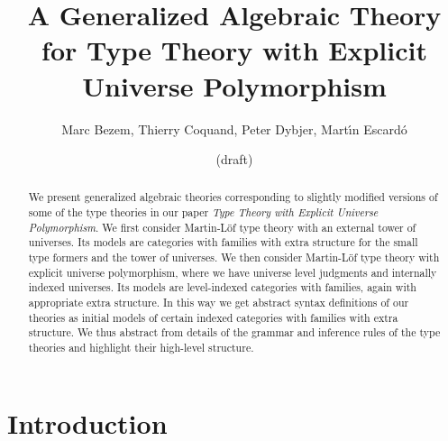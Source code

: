 \documentclass[11pt,a4paper]{article}
\theoremstyle{plain}
\theoremstyle{definition}
\begin{document}
\title{A Generalized Algebraic Theory\\ for Type Theory
with Explicit Universe Polymorphism
}

\author{Marc Bezem, Thierry Coquand, Peter Dybjer, Mart\'{\i}n Escard\'o}

\date{(draft)}
\maketitle

\begin{abstract}
We present generalized algebraic theories corresponding to slightly modified versions of some of the type theories in our paper 
{\em Type Theory with Explicit Universe Polymorphism}. We first consider Martin-Löf type theory with an external tower of universes. Its models are categories with families with extra structure for the small type formers and the tower of universes. We then consider Martin-Löf type theory with explicit universe polymorphism, where we have universe level judgments and internally indexed universes. Its models are level-indexed categories with families, again with appropriate extra structure.
In this way we get abstract syntax definitions of our theories as initial models of certain indexed categories with families with extra structure. We thus abstract from details of the grammar and inference rules of the type theories and highlight their high-level structure.
\end{abstract}

\section{Introduction}
\end{document}
